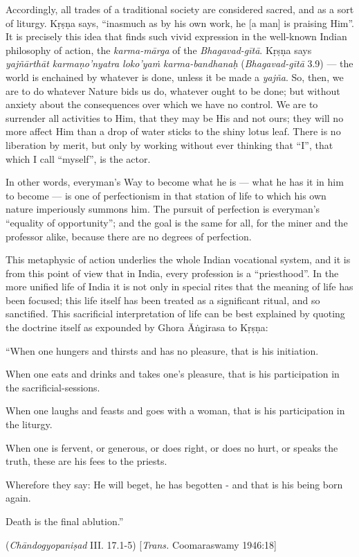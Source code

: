 Accordingly, all trades of a traditional society are considered sacred, and as a sort of liturgy. Kṛṣṇa says, “inasmuch as by his own work, he [a man] is praising Him”. It is precisely this idea that finds such vivid expression in the well-known Indian philosophy of action, the {\sl karma-mārga} of the {\sl Bhagavad-gītā}. Kṛṣṇa says {\sl yajñārthāt karmaṇo’nyatra loko’yaṁ karma-bandhanaḥ} ({\sl Bhagavad-gītā} 3.9) --- the world is enchained by whatever is done, unless it be made a {\sl yajña}. So, then, we are to do whatever Nature bids us do, whatever ought to be done; but without anxiety about the consequences over which we have no control. We are to surrender all activities to Him, that they may be His and not ours; they will no more affect Him than a drop of water sticks to the shiny lotus leaf. There is no liberation by merit, but only by working without ever thinking that “I”, that which I call “myself”, is the actor.

In other words, everyman’s Way to become what he is --- what he has it in him to become --- is one of perfectionism in that station of life to which his own nature imperiously summons him. The pursuit of perfection is everyman’s “equality of opportunity”; and the goal is the same for all, for the miner and the professor alike, because there are no degrees of perfection. 

This metaphysic of action underlies the whole Indian vocational system, and it is from this point of view that in India, every profession is a “priesthood”. In the more unified life of India it is not only in special rites that the meaning of life has been focused; this life itself has been treated as a significant ritual, and so sanctified. This sacrificial interpretation of life can be best explained by quoting the doctrine itself as expounded by Ghora Āṅgirasa to Kṛṣṇa: 

\begin{myquote}
“When one hungers and thirsts and has no pleasure, that is his initiation. 

When one eats and drinks and takes one’s pleasure, that is his participation in the sacrificial-sessions. 

When one laughs and feasts and goes with a woman, that is his participation in the liturgy. 

When one is fervent, or generous, or does right, or does no hurt, or speaks the truth, these are his fees to the priests. 

Wherefore they say: He will beget, he has begotten - and that is his being born again. 

Death is the final ablution.” 

\hfill({\sl Chāndogyopaniṣad}
 III. 17.1-5) [{\sl Trans.} Coomaraswamy 1946:18] 
\end{myquote}

